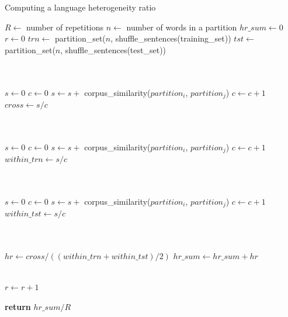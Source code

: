 \documentclass[output=paper
,modfonts
,nonflat,draftmode]{langsci/langscibook}
\begin{document}
\begin{algorithm}
\caption{\label{alg:heterogeneity-ratio}Computing a language heterogeneity ratio}
{\fontsize{9}{9}\selectfont
\begin{algorithmic}[1]
\State $R \gets$ number of repetitions
\State $n \gets$ number of words in a partition
\State $hr\_sum \gets 0$
\State $r \gets 0$
    \State $trn \gets $ partition\_set($n$, shuffle\_sentences(training\_set))
    \State $tst \gets $ partition\_set($n$, shuffle\_sentences(test\_set))
    
    \\ \\
    \State $s \gets 0$
    \State $c \gets 0$
            \State $s \gets s + $ corpus\_similarity($partition_i$, $partition_j$)
            \State $c \gets c + 1$
        \EndFor
    \EndFor
    \State $cross \gets s / c$

    \\ \\
    \State $s \gets 0$
    \State $c \gets 0$
            \State $s \gets s + $ corpus\_similarity($partition_i$, $partition_j$)
            \State $c \gets c + 1$
        \EndFor
    \EndFor
    \State $within\_trn \gets s / c$
    
    \\ \\
    \State $s \gets 0$
    \State $c \gets 0$
            \State $s \gets s + $ corpus\_similarity($partition_i$, $partition_j$)
            \State $c \gets c + 1$
        \EndFor
    \EndFor
    \State $within\_tst \gets s / c$
    
    \\ \\
    \State $hr \gets cross / ((within\_trn + within\_tst)/2)$
    \State $hr\_sum \gets hr\_sum + hr$
    
    \\
    \State $r \gets r + 1$
\EndWhile

\State \textbf{return} $hr\_sum / R$
\end{algorithmic}
}
\end{algorithm}
\end{document}
